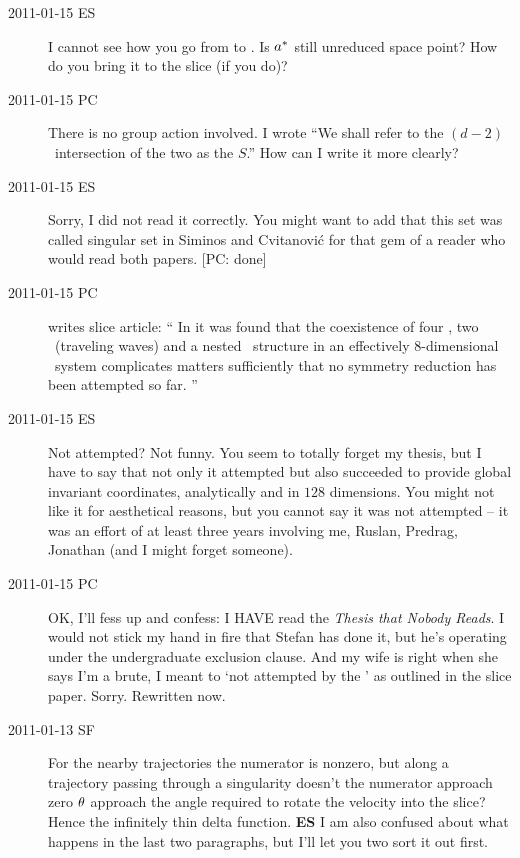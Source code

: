\begin{description}
\item[2011-01-15 ES]
I cannot see how you go from  to .
Is $a^\ast$ still unreduced space point? How do you bring it to the
slice (if you do)?

\item[2011-01-15 PC] There is no group action involved. I wrote
``We shall refer to the $(d\!-\!2)$\dmn\ intersection of the two as the
{\em \sset} $S$.'' How can I write it more clearly?

\item[2011-01-15 ES] Sorry, I did not read it correctly. You might want to
add that this set was called singular set in
Siminos and Cvitanovi\'c for that gem of a reader who would
read both papers. [PC: done]

\item[2011-01-15 PC] writes slice article: ``
In  it
was found that the coexistence of four \eqva, two \reqva\
(traveling waves) and a
nested \fixedsp\ structure in an effectively $8$-dimensional \KS\ system
complicates matters sufficiently that no symmetry reduction has been
attempted so far.
''

\item[2011-01-15 ES]  Not attempted? Not funny. You seem to
totally forget my thesis, but I have to say that not only it attempted
but also succeeded to provide global invariant coordinates, analytically
and in $128$ dimensions. You might not like it for aesthetical reasons,
but you cannot say it was not attempted -- it was an effort of
at least three years involving me, Ruslan, Predrag, Jonathan (and I might
forget someone).

\item[2011-01-15 PC]
OK, I'll fess up and confess: I HAVE read the
\emph{
           {Thesis that Nobody Reads}}.
I would not stick my hand in fire that Stefan has done it, but he's
operating under the undergraduate exclusion clause. And my wife is right
when she says I'm a brute, I meant to `not attempted by the \mslices' as
outlined in the slice paper. Sorry. Rewritten now.

\item[2011-01-13 SF]
For the nearby trajectories the numerator is nonzero, but along a
trajectory passing through a singularity doesn't the numerator approach
zero $\theta$ approach the angle required to rotate the velocity into
the slice? Hence the infinitely thin delta function. {\bf ES} I am also
confused about what happens in the last two paragraphs, but I'll let you
two sort it out first.


\end{description}
